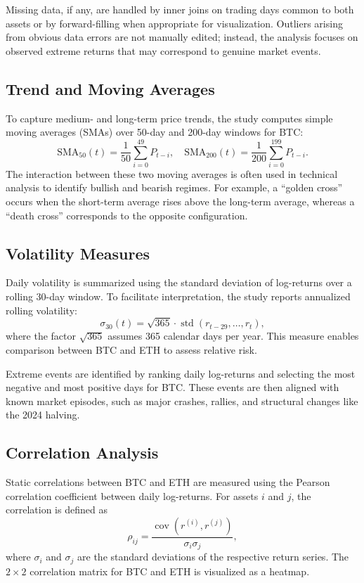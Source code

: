 \documentclass[conference]{IEEEtran}
\begin{document}
Missing data, if any, are handled by inner joins on trading days common to both assets or by forward-filling when appropriate for visualization. Outliers arising from obvious data errors are not manually edited; instead, the analysis focuses on observed extreme returns that may correspond to genuine market events.

\subsection{Trend and Moving Averages}
To capture medium- and long-term price trends, the study computes simple moving averages (SMAs) over 50-day and 200-day windows for BTC:
\[
\text{SMA}_{50}(t) = \frac{1}{50} \sum_{i=0}^{49} P_{t-i}, \quad
\text{SMA}_{200}(t) = \frac{1}{200} \sum_{i=0}^{199} P_{t-i}.
\]
The interaction between these two moving averages is often used in technical analysis to identify bullish and bearish regimes. For example, a ``golden cross'' occurs when the short-term average rises above the long-term average, whereas a ``death cross'' corresponds to the opposite configuration.

\subsection{Volatility Measures}
Daily volatility is summarized using the standard deviation of log-returns over a rolling 30-day window. To facilitate interpretation, the study reports annualized rolling volatility:
\[
\sigma_{30}(t) = \sqrt{365} \cdot \operatorname{std}\left(r_{t-29}, \dots, r_t\right),
\]
where the factor \(\sqrt{365}\) assumes 365 calendar days per year. This measure enables comparison between BTC and ETH to assess relative risk.

Extreme events are identified by ranking daily log-returns and selecting the most negative and most positive days for BTC. These events are then aligned with known market episodes, such as major crashes, rallies, and structural changes like the 2024 halving.

\subsection{Correlation Analysis}
Static correlations between BTC and ETH are measured using the Pearson correlation coefficient between daily log-returns. For assets \(i\) and \(j\), the correlation is defined as
\[
\rho_{ij} = \frac{\operatorname{cov}(r^{(i)}, r^{(j)})}
{\sigma_i \sigma_j},
\]
where \(\sigma_i\) and \(\sigma_j\) are the standard deviations of the respective return series. The \(2 \times 2\) correlation matrix for BTC and ETH is visualized as a heatmap.
\end{document}

